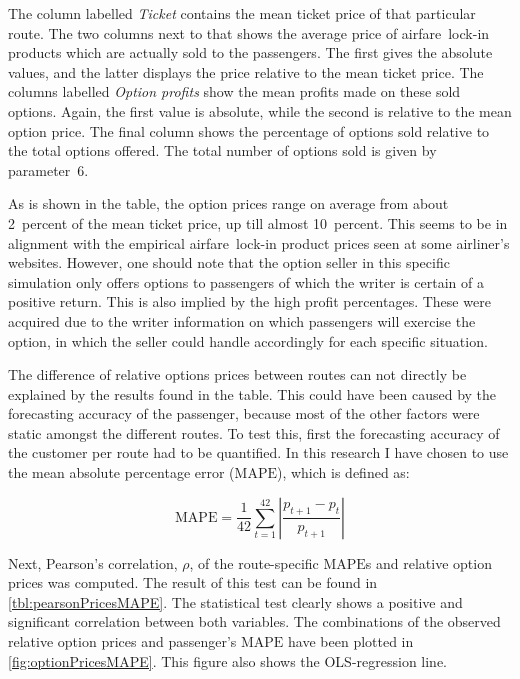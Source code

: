 The column labelled \emph{Ticket} contains the mean ticket price of that particular route. The two columns next to that shows the average price of airfare~lock-in products which are actually sold to the passengers. The first gives the absolute values, and the latter displays the price relative to the mean ticket price. The columns labelled \emph{Option profits} show the mean profits made on these sold options. Again, the first value is absolute, while the second is relative to the mean option price. The final column shows the percentage of options sold relative to the total options offered. The total number of options sold is given by parameter~6.

As is shown in the table, the option prices range on average from about 2~percent of the mean ticket price, up till almost 10~percent. This seems to be in alignment with the empirical airfare~lock-in product prices seen at some airliner's websites. However, one should note that the option seller in this specific simulation only offers options to passengers of which the writer is certain of a positive return. This is also implied by the high profit percentages. These were acquired due to the writer information on which passengers will exercise the option, in which the seller could handle accordingly for each specific situation.

The difference of relative options prices between routes can not directly be explained by the results found in the table. This could have been caused by the forecasting accuracy of the passenger, because most of the other factors were static amongst the different routes. To test this, first the forecasting accuracy of the customer per route had to be quantified. In this research I have chosen to use the mean absolute percentage error ($\mbox{MAPE}$), which is defined as:

$$\mbox{MAPE} = \frac{1}{42}\sum_{t=1}^{42} \left| \frac{p_{t+1}-p_t}{p_{t+1}}\right|$$

Next, Pearson's correlation, $\rho$, of the route-specific $\mbox{MAPE}$s and relative option prices was computed. The result of this test can be found in \autoref{tbl:pearsonPricesMAPE}. The statistical test clearly shows a positive and significant correlation between both variables. The combinations of the observed relative option prices and passenger's $\mbox{MAPE}$ have been plotted in \autoref{fig:optionPricesMAPE}. This figure also shows the OLS-regression line.

